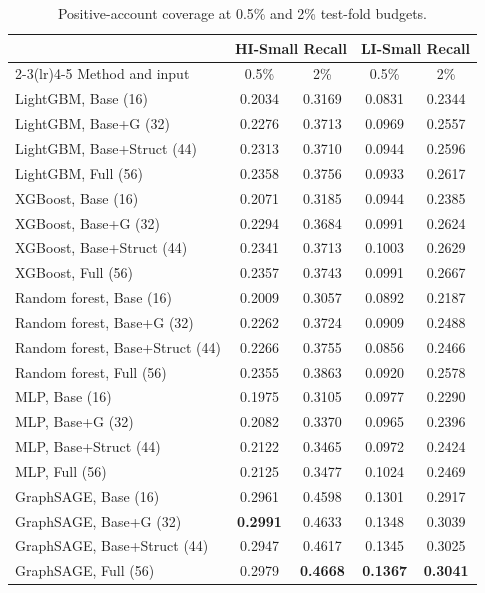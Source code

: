 \begin{table}[htbp]
\centering
\footnotesize
\setlength{\tabcolsep}{5pt}
\caption{Positive-account coverage at 0.5\% and 2\% test-fold budgets.}
\label{tab:budgetapp}
\begin{threeparttable}
\begin{tabular}{lcccc}
\toprule
& \multicolumn{2}{c}{HI-Small Recall} & \multicolumn{2}{c}{LI-Small Recall} \\
\cmidrule(lr){2-3}\cmidrule(lr){4-5}
Method and input & 0.5\% & 2\% & 0.5\% & 2\% \\
\midrule
LightGBM, Base (16) & 0.2034 & 0.3169 & 0.0831 & 0.2344 \\
LightGBM, Base+G (32) & 0.2276 & 0.3713 & 0.0969 & 0.2557 \\
LightGBM, Base+Struct (44) & 0.2313 & 0.3710 & 0.0944 & 0.2596 \\
LightGBM, Full (56) & 0.2358 & 0.3756 & 0.0933 & 0.2617 \\
\addlinespace
XGBoost, Base (16) & 0.2071 & 0.3185 & 0.0944 & 0.2385 \\
XGBoost, Base+G (32) & 0.2294 & 0.3684 & 0.0991 & 0.2624 \\
XGBoost, Base+Struct (44) & 0.2341 & 0.3713 & 0.1003 & 0.2629 \\
XGBoost, Full (56) & 0.2357 & 0.3743 & 0.0991 & 0.2667 \\
\addlinespace
Random forest, Base (16) & 0.2009 & 0.3057 & 0.0892 & 0.2187 \\
Random forest, Base+G (32) & 0.2262 & 0.3724 & 0.0909 & 0.2488 \\
Random forest, Base+Struct (44) & 0.2266 & 0.3755 & 0.0856 & 0.2466 \\
Random forest, Full (56) & 0.2355 & 0.3863 & 0.0920 & 0.2578 \\
\addlinespace
MLP, Base (16) & 0.1975 & 0.3105 & 0.0977 & 0.2290 \\
MLP, Base+G (32) & 0.2082 & 0.3370 & 0.0965 & 0.2396 \\
MLP, Base+Struct (44) & 0.2122 & 0.3465 & 0.0972 & 0.2424 \\
MLP, Full (56) & 0.2125 & 0.3477 & 0.1024 & 0.2469 \\
\addlinespace
GraphSAGE, Base (16) & 0.2961 & 0.4598 & 0.1301 & 0.2917 \\
GraphSAGE, Base+G (32) & \textbf{0.2991} & 0.4633 & 0.1348 & 0.3039 \\
GraphSAGE, Base+Struct (44) & 0.2947 & 0.4617 & 0.1345 & 0.3025 \\
GraphSAGE, Full (56) & 0.2979 & \textbf{0.4668} & \textbf{0.1367} & \textbf{0.3041} \\

\end{tabular}
\end{threeparttable}
\end{table}
